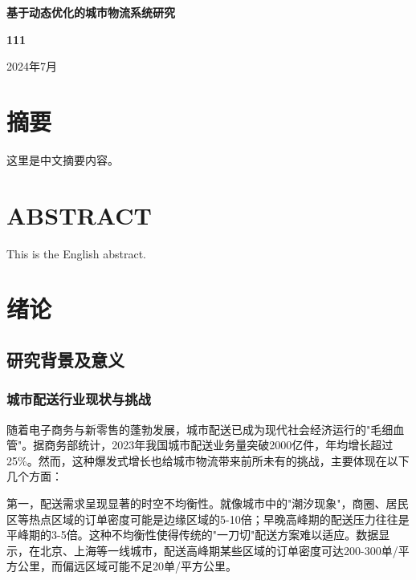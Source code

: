 \documentclass[12pt,a4paper,twoside]{ctexbook}
\begin{document}
    

\frontmatter
{}

\begin{titlepage}
\begin{center}
\vspace*{2cm}
{\huge\bfseries 基于动态优化的城市物流系统研究\par}
\vspace{2cm}
{\large\bfseries 111\par}
\vspace{1cm}
{\large 2024年7月\par}
\end{center}
\end{titlepage}

\chapter*{摘要}
这里是中文摘要内容。

\chapter*{ABSTRACT}
This is the English abstract.

\tableofcontents

\mainmatter
{}

\chapter{绪论}
\section{研究背景及意义}
\subsection{城市配送行业现状与挑战}
随着电子商务与新零售的蓬勃发展，城市配送已成为现代社会经济运行的"毛细血管"。据商务部统计，2023年我国城市配送业务量突破2000亿件，年均增长超过25\%。然而，这种爆发式增长也给城市物流带来前所未有的挑战，主要体现在以下几个方面：

第一，配送需求呈现显著的时空不均衡性。就像城市中的"潮汐现象"，商圈、居民区等热点区域的订单密度可能是边缘区域的5-10倍；早晚高峰期的配送压力往往是平峰期的3-5倍。这种不均衡性使得传统的"一刀切"配送方案难以适应。数据显示，在北京、上海等一线城市，配送高峰期某些区域的订单密度可达200-300单/平方公里，而偏远区域可能不足20单/平方公里。
\end{document}
